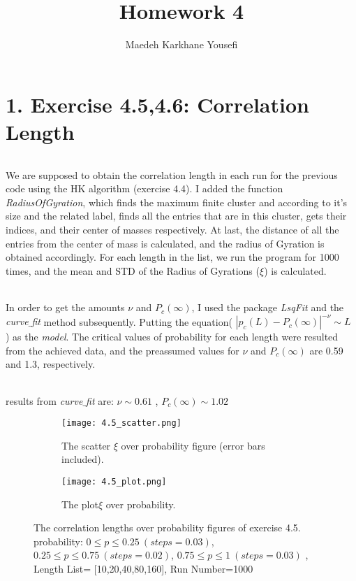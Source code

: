 \documentclass[12pt]{article}
\title{\textbf{Homework 4}}
\author{Maedeh Karkhane Yousefi}
\begin{document}
\maketitle
\part*{1. Exercise 4.5,4.6: Correlation Length }
\paragraph*{} We are supposed to obtain the correlation length in each run for the previous code using the HK algorithm (exercise 4.4). I added the function \textit{RadiusOfGyration}, which finds the maximum finite cluster and according to it's size and the related label, finds all the entries that are in this cluster, gets their indices, and their center of masses respectively. At last, the distance of all the entries from the center of mass is calculated, and the radius of Gyration is obtained accordingly. 
For each length in the list, we run the program for 1000 times, and the mean and STD of the Radius of Gyrations ($\xi$) is calculated.
\paragraph*{} In order to get the amounts $\nu$ and $P_{c}(\infty)$, I used the package \textit{LsqFit} and the \textit{curve$\_$fit} method subsequently. Putting the equation( $\left|p_{c}(L)-P_{c}(\infty)\right|^{-\nu} \sim L$ ) as the \textit{model}. The critical values of probability for each length were resulted from the achieved data, and the preassumed values for $\nu$ and $P_{c}(\infty)$ are 0.59 and 1.3, respectively.
\paragraph*{} results from \textit{curve$\_$fit} are: $\nu \sim 0.61$ , $ P_{c}(\infty) \sim 1.02$
\begin{figure}[H]
	\centering
	\begin{subfigure}[t]{0.8\textwidth}
		\texttt{[image: 4.5\_scatter.png]}
		\label{fig:mesh1.1}
		\caption{The scatter $\xi$ over probability figure (error bars included).}
	\end{subfigure}\par\bigskip 
	\begin{subfigure}[t]{0.8\textwidth}
		\texttt{[image: 4.5\_plot.png]}
		\label{fig:mesh1.2}
		\caption{The plot$\xi$ over probability.}
	\end{subfigure}
	\label{fig:mesh1}
	\caption{The correlation lengths over probability figures of exercise 4.5. probability: $0\leq p \leq 0.25\ (steps=0.03)$,$0.25\leq p \leq 0.75\ (steps=0.02)$, $0.75\leq p \leq 1\ (steps=0.03)$ , Length List= [10,20,40,80,160], Run Number=1000}
\end{figure}
\end{document}
